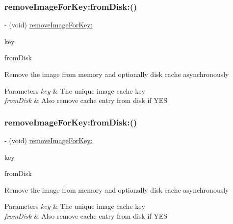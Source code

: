 \subsubsection{\texorpdfstring{remove\+Image\+For\+Key\+:from\+Disk\+:()}{removeImageForKey:fromDisk:()}\hspace{0.1cm}{\footnotesize\ttfamily [1/3]}}
{\footnotesize\ttfamily -\/ (void) \mbox{\hyperlink{interface_s_d_image_cache_a1d6ca2afef59216e0cb1740d431833cf}{remove\+Image\+For\+Key\+:}} \begin{DoxyParamCaption}\item[{(N\+S\+String $\ast$)}]{key }\item[{fromDisk:(B\+O\+OL)}]{from\+Disk }\end{DoxyParamCaption}}

Remove the image from memory and optionally disk cache asynchronously


\begin{DoxyParams}{Parameters}
{\em key} & The unique image cache key \\
\hline
{\em from\+Disk} & Also remove cache entry from disk if Y\+ES \\
\hline
\end{DoxyParams}
\mbox{\label{interface_s_d_image_cache_a61cf4a9222043f0b302b8fdb0b522e3f}} 
\subsubsection{\texorpdfstring{remove\+Image\+For\+Key\+:from\+Disk\+:()}{removeImageForKey:fromDisk:()}\hspace{0.1cm}{\footnotesize\ttfamily [2/3]}}
{\footnotesize\ttfamily -\/ (void) \mbox{\hyperlink{interface_s_d_image_cache_a1d6ca2afef59216e0cb1740d431833cf}{remove\+Image\+For\+Key\+:}} \begin{DoxyParamCaption}\item[{(N\+S\+String $\ast$)}]{key }\item[{fromDisk:(B\+O\+OL)}]{from\+Disk }\end{DoxyParamCaption}}

Remove the image from memory and optionally disk cache asynchronously


\begin{DoxyParams}{Parameters}
{\em key} & The unique image cache key \\
\hline
{\em from\+Disk} & Also remove cache entry from disk if Y\+ES \\
\hline
\end{DoxyParams}
\mbox{\label{interface_s_d_image_cache_a61cf4a9222043f0b302b8fdb0b522e3f}} 
